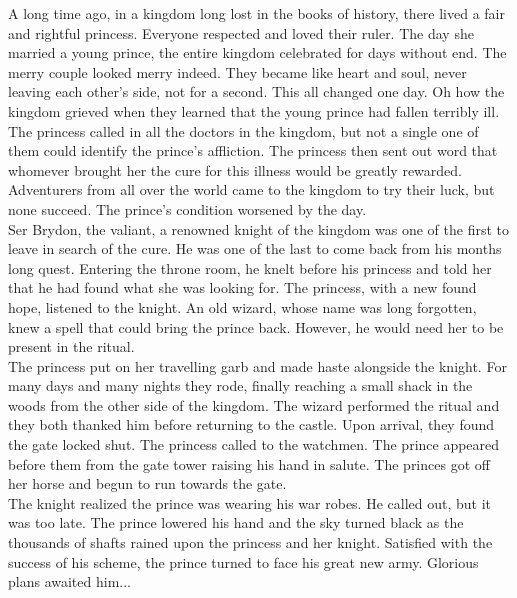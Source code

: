 \documentclass[a4paper,onecolumn,11pt]{article}
\begin{document}
A long time ago, in a kingdom long lost in the books of history, there lived a fair and rightful princess. Everyone respected and loved their ruler. The day she married a young prince, the entire kingdom celebrated for days without end. The merry couple looked merry indeed. They became like heart and soul, never leaving each other's side, not for a second. This all changed one day. Oh how the kingdom grieved when they learned that the young prince had fallen terribly ill.\\
\newline
The princess called in all the doctors in the kingdom, but not a single one of them could identify the prince’s affliction. The princess then sent out word that whomever brought her the cure for this illness would be greatly rewarded. Adventurers from all over the world came to the kingdom to try their luck, but none succeed. The prince’s condition worsened by the day.\\
\newline
Ser Brydon, the valiant, a renowned knight of the kingdom was one of the first to leave in search of the cure. He was one of the last to come back from his months long quest. Entering the throne room, he knelt before his princess and told her that he had found what she was looking for. The princess, with a new found hope, listened to the knight. An old wizard, whose name was long forgotten, knew a spell that could bring the prince back. However, he would need her to be present in the ritual.\\
\newline
The princess put on her travelling garb and made haste alongside the knight. For many days and many nights they rode, finally reaching a small shack in the woods from the other side of the kingdom. The wizard performed the ritual and they both thanked him before returning to the castle. Upon arrival, they found the gate locked shut. The princess called to the watchmen. The prince appeared before them from the gate tower raising his hand in salute. The princes got off her horse and begun to run towards the gate.\\
\newline
The knight realized the prince was wearing his war robes. He called out, but it was too late. The prince lowered his hand and the sky turned black as the thousands of shafts rained upon the princess and her knight. Satisfied with the success of his scheme, the prince turned to face his great new army. Glorious plans awaited him...
\end{document}
